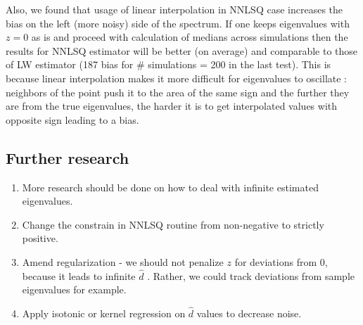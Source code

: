 \documentclass{article}
\begin{document}
Also, we found that usage of linear interpolation in NNLSQ case increases the bias on the left (more noisy) side of the spectrum. If one keeps eigenvalues with $z=0$ as is and proceed with calculation of medians across simulations then the results for NNLSQ estimator will be better (on average) and comparable to those of LW estimator (187 bias for \# simulations = 200 in the last test). This is because linear interpolation makes it more difficult for eigenvalues to oscillate : neighbors of the point push it to the area of the same sign and the further they are from the true eigenvalues, the harder it is to get interpolated values with opposite sign leading to a bias. 

\subsection*{Further research}

\begin{enumerate}
\item More research should be done on how to deal with infinite estimated eigenvalues.
\item Change the constrain in NNLSQ routine from non-negative to strictly positive. 
\item Amend regularization - we should not penalize $z$ for deviations from 0, because it leads to infinite $\hat{d}$ . Rather, we could track deviations from sample eigenvalues for example.
\item Apply isotonic or kernel regression on $\hat{d}$ values to decrease noise.
\end{enumerate}
\end{document}
